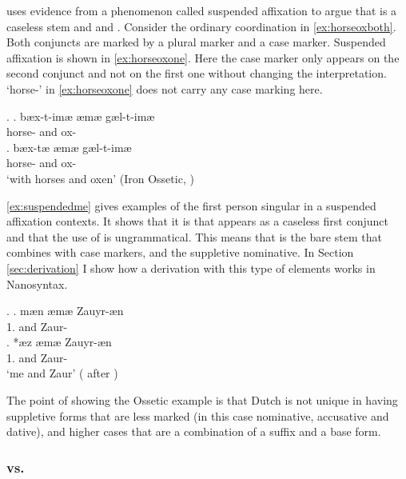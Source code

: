 \documentclass[12pt]{article}
\begin{document}
\citet{caha2019competition} uses evidence from a phenomenon called suspended affixation to argue that  is a caseless stem and and . Consider the ordinary coordination in \ref{ex:horseoxboth}. Both conjuncts are marked by a plural marker and a case marker. Suspended affixation is shown in \ref{ex:horseoxone}. Here the case marker only appears on the second conjunct and not on the first one without changing the interpretation.
 `horse-' in \ref{ex:horseoxone} does not carry any case marking here.

\ex.
\ag. bæx-t-imæ æmæ gæl-t-imæ\\
horse- and ox-\\\label{ex:horseoxboth}
\bg. bæx-tæ æmæ gæl-t-imæ\\
horse- and ox-\\
`with horses and oxen' \hfill (Iron Ossetic, \citep[165]{erschler2012})\label{ex:horseoxone}

\ref{ex:suspendedme} gives examples of the first person singular in a suspended affixation contexts. It shows that it is  that appears as a caseless first conjunct and that the use of  is ungrammatical. This means that  is the bare stem that combines with case markers, and  the suppletive nominative. In Section \ref{sec:derivation} I show how a derivation with this type of elements works in Nanosyntax.

\ex.\label{ex:suspendedme}
\ag. mæn æmæ Zauyr-æn\\
 1. and Zaur-\\\label{ex:izaurboth}
\bg. *æz æmæ Zauyr-æn\\
 1. and Zaur-\\
 `me and Zaur' \hfill (\citealt[39]{беляев2014} after \citealt{caha2019competition})\label{ex:izaurone}

The point of showing the Ossetic example is that Dutch is not unique in having suppletive forms that are less marked (in this case nominative, accusative and dative), and higher cases that are a combination of a suffix and a base form.



\subsubsection{ vs. }
\end{document}
